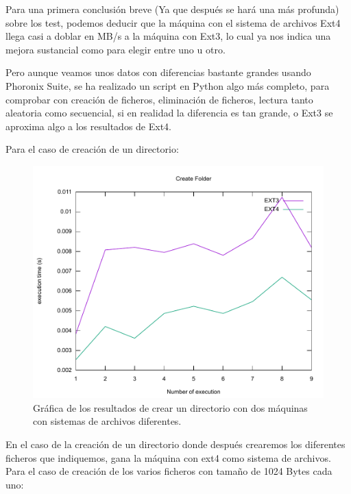Para una primera conclusión breve (Ya que después se hará una más profunda) sobre los test, podemos deducir que la máquina con el sistema de archivos Ext4 llega casi a doblar en MB/s a la máquina con Ext3, lo cual ya nos indica una mejora sustancial como para elegir entre uno u otro.

\newpage
Pero aunque veamos unos datos con diferencias bastante grandes usando Phoronix Suite, se ha realizado un script en Python algo más completo, para comprobar con creación de ficheros, eliminación de ficheros, lectura tanto aleatoria como secuencial, si en realidad la diferencia es tan grande, o Ext3 se aproxima algo a los resultados de Ext4.

Para el caso de creación de un directorio:

\begin{figure}[H]
	\begin{center}
		\includegraphics[width=15cm]{Imagenes/CreateFolder}
		\caption{Gráfica de los resultados de crear un directorio con dos máquinas con sistemas de archivos diferentes.}
		\label{fig:28}
	\end{center}
\end{figure}

En el caso de la creación de un directorio donde después crearemos los diferentes ficheros que indiquemos, gana la máquina con ext4 como sistema de archivos.
\newpage
Para el caso de creación de los varios ficheros con tamaño de 1024 Bytes cada uno:

